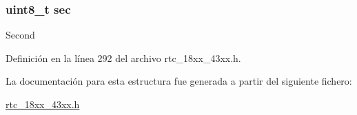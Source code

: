 \subsubsection[{\texorpdfstring{sec}{sec}}]{\setlength{\rightskip}{0pt plus 5cm}uint8\+\_\+t sec}\hypertarget{struct_r_t_c___e_v___t_i_m_e_s_t_a_m_p___t_ad1696900026b287a87c563b733a21bc3}{}\label{struct_r_t_c___e_v___t_i_m_e_s_t_a_m_p___t_ad1696900026b287a87c563b733a21bc3}
Second 

Definición en la línea 292 del archivo rtc\+\_\+18xx\+\_\+43xx.\+h.



La documentación para esta estructura fue generada a partir del siguiente fichero\+:\begin{DoxyCompactItemize}
\item 
\hyperlink{rtc__18xx__43xx_8h}{rtc\+\_\+18xx\+\_\+43xx.\+h}\end{DoxyCompactItemize}
